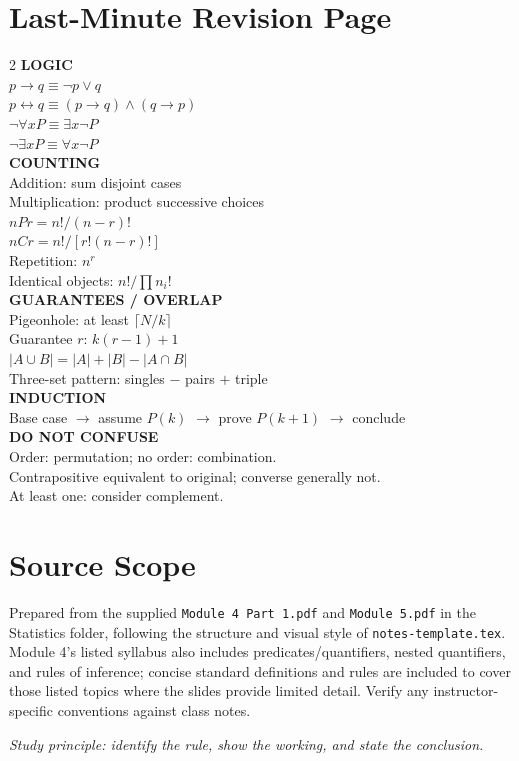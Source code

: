 \documentclass[11pt,a4paper]{article}
\begin{document}
\section{Last-Minute Revision Page}
\begin{multicols}{2}
\textbf{LOGIC}\\
$p\to q\equiv\neg p\lor q$\\
$p\leftrightarrow q\equiv(p\to q)\land(q\to p)$\\
$\neg\forall xP\equiv\exists x\neg P$\\
$\neg\exists xP\equiv\forall x\neg P$\\[4pt]
\textbf{COUNTING}\\
Addition: sum disjoint cases\\
Multiplication: product successive choices\\
$nP r=n!/(n-r)!$\\
$nC r=n!/[r!(n-r)!]$\\
Repetition: $n^r$\\
Identical objects: $n!/\prod n_i!$\\[4pt]
\textbf{GUARANTEES / OVERLAP}\\
Pigeonhole: at least $\lceil N/k\rceil$\\
Guarantee $r$: $k(r-1)+1$\\
$|A\cup B|=|A|+|B|-|A\cap B|$\\
Three-set pattern: singles $-$ pairs $+$ triple\\[4pt]
\textbf{INDUCTION}\\
Base case $\to$ assume $P(k)$ $\to$ prove $P(k+1)$ $\to$ conclude\\[4pt]
\textbf{DO NOT CONFUSE}\\
Order: permutation; no order: combination.\\
Contrapositive equivalent to original; converse generally not.\\
At least one: consider complement.\\
\end{multicols}

\section*{Source Scope}
Prepared from the supplied \texttt{Module 4 Part 1.pdf} and \texttt{Module 5.pdf} in the Statistics folder, following the structure and visual style of \texttt{notes-template.tex}. Module 4's listed syllabus also includes predicates/quantifiers, nested quantifiers, and rules of inference; concise standard definitions and rules are included to cover those listed topics where the slides provide limited detail. Verify any instructor-specific conventions against class notes.

\vfill
\begin{center}\textit{Study principle: identify the rule, show the working, and state the conclusion.}\end{center}
\end{document}
